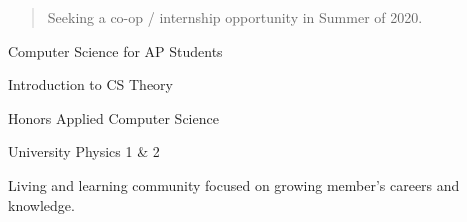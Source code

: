   \begin{quote}
    Seeking a co-op / internship opportunity in Summer of 2020.
  \end{quote}


  Computer Science for AP Students \par
  Introduction to CS Theory \par
  Honors Applied Computer Science \par
  University Physics 1 \& 2



  \smallskip{}
  \cvtag{\LaTeX}



  Living and learning community focused on growing member's careers and knowledge.


